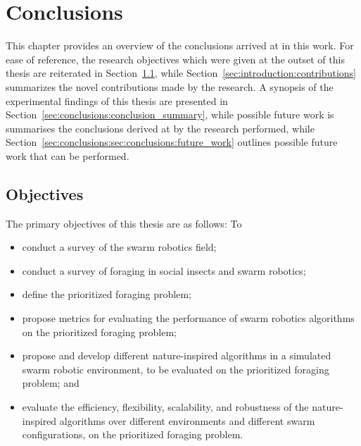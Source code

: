 
\chapter{Conclusions}
\label{chap:conclusions}

This chapter provides an overview of the conclusions arrived at in this work. For ease of reference, the research objectives which were given at the outset of this thesis are reiterated in Section~\ref{sec:introduction:objectives}, while Section~\ref{sec:introduction:contributions} summarizes the novel contributions made by the research. A synopsis of the experimental findings of this thesis are presented in Section~\ref{sec:conclusions:conclusion_summary}, while possible future work is  summarises the conclusions derived at by the research performed, while Section~\ref{sec:conclusions:sec:conclusions:future_work} outlines possible future work that can be performed.


\section{Objectives}
\label{sec:introduction:objectives}

The primary objectives of this thesis are as follows: To

\begin{itemize}
	\item conduct a survey of the swarm robotics field;
	\item conduct a survey of foraging in social insects and  swarm robotics;
	\item define the prioritized foraging problem;
	\item propose metrics for evaluating the performance of swarm robotics algorithms on the prioritized foraging problem;
	\item propose and develop different nature-inspired algorithms in a simulated swarm robotic environment, to be evaluated on the prioritized foraging problem; and
	\item evaluate the efficiency, flexibility, scalability, and robustness of the nature-inspired algorithms over different environments and different swarm configurations, on the prioritized foraging problem.
\end{itemize}



